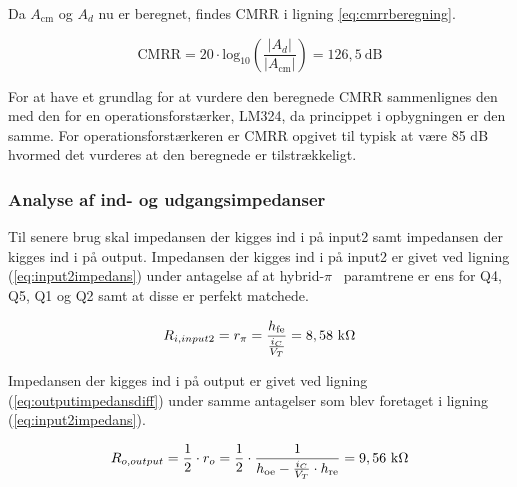 Da $A_\mathrm{cm}$ og $A_d$ nu er beregnet, findes CMRR i ligning \ref{eq:cmrrberegning}.

\begin{equation}
\mathrm{CMRR}=20 \cdot \mathrm{log}_{10} \left( \frac{|A_d|}{|A_\mathrm{cm}|}\right)=126,5~\mathrm{dB}
\label{eq:cmrrberegning}
\end{equation}

For at have et grundlag for at vurdere den beregnede CMRR sammenlignes den med den for en operationsforstærker, LM324, da princippet i opbygningen er den samme. For operationsforstærkeren er CMRR opgivet til typisk at være 85 dB hvormed det vurderes at den beregnede er tilstrækkeligt. 

\subsubsection*{Analyse af ind- og udgangsimpedanser}
Til senere brug skal impedansen der kigges ind i på input2 samt impedansen der kigges ind i på output. 
Impedansen der kigges ind i på input2 er givet ved ligning (\ref{eq:input2impedans}) under antagelse af at hybrid-$\pi$~ paramtrene er ens for Q4, Q5, Q1 og Q2 samt at disse er perfekt matchede. 

\begin{equation}
R_{i, input2}= r_\pi = \frac{h_\mathrm{fe}}{\frac{i_C}{V_T}} = 8,58~\mathrm{k}\ohm
\label{eq:input2impedans}
\end{equation}

Impedansen der kigges ind i på output er givet ved ligning (\ref{eq:outputimpedansdiff}) under samme antagelser som blev foretaget i ligning (\ref{eq:input2impedans}).

\begin{equation}
R_{o, output} = \frac{1}{2} \cdot r_o = \frac{1}{2} \cdot \frac{1}{h_\mathrm{oe} - \frac{i_C}{V_T} \cdot h_\mathrm{re}} = 9,56~\mathrm{k}\ohm
\label{eq:outputimpedansdiff}
\end{equation}

